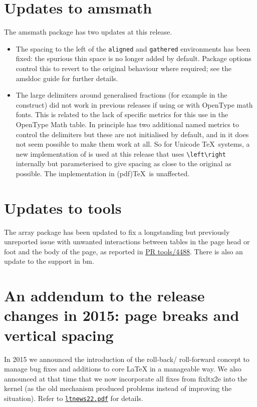 \documentclass{ltnews}
\begin{document}
\section{Updates to \textsf{amsmath}}
The \textsf{amsmath} package has two updates at this release.
\begin{itemize}
\item The spacing to the left of the \texttt{aligned} and
  \texttt{gathered} environments has been fixed: the spurious thin
  space is no longer added by default. Package options control this
  to revert to the original behaviour where required; see the
  \textsf{amsldoc} guide for further details.
\item The large delimiters around generalised fractions (for example
  in the  construct) did not work in previous releases if
  using  or  with OpenType math fonts. This is
  related to the lack of specific metrics for this use in the OpenType Math
  table. In principle  has two additional named metrics
  to control the delimiters but these are not initialised by default,
  and in  it does not seem possible to make them work at all.
  So for Unicode \TeX\ systems, a new implementation of
   is used at this release that uses \verb|\left\right|
  internally but parameterised to give spacing as close to the
  original as possible. The implementation in (pdf)\TeX\ is
  unaffected.
\end{itemize}

\section{Updates to \textsf{tools}}
The \textsf{array} package has been updated to fix a longstanding but
previously unreported issue with unwanted interactions between tables
in the page head or foot and the body of the page, as reported in
\href{http://www.latex-project.org/cgi-bin/ltxbugs2html?pr=tools/4488}{PR
  tools/4488}.
There is also an update to the  support in \textsf{bm}.

\section{An addendum to the release changes in 2015:  page breaks and vertical spacing}

In 2015 we announced the introduction of the roll-back\slash
roll-forward concept to manage bug fixes and additions to core
\LaTeX{} in a manageable way. We also announced at that time
that we now incorporate all fixes from \textsf{fixltx2e} into the
kernel (as the old mechanism produced problems instead of improving
the situation). Refer to
\href{https://www.latex-project.org/news/latex2e-news/ltnews22.pdf}{\texttt{ltnews22.pdf}}
for details.
\end{document}
